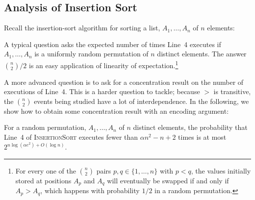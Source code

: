 \documentclass[lotsofwhite]{patmorin}
\begin{document}
\subsection{Analysis of Insertion Sort}

Recall the insertion-sort algorithm for sorting a list, $A_1,\ldots,A_n$
of $n$ elements:

\begin{algorithmic}[1]
     \ENDWHILE
  \ENDFOR
\end{algorithmic}

A typical question asks the expected number of times Line~4 executes
if $A_1,\ldots,A_n$ is a uniformly random permutation of $n$ distinct
elements.  The answer $\binom{n}{2}/2$ is an easy application of
linearity of expectation.\footnote{For every one of the $\binom{n}{2}$
pairs $p,q\in\{1,\ldots,n\}$ with $p<q$, the values initially stored at
positions $A_p$ and $A_q$ will eventually be swapped if and only if $A_p >
A_q$, which happens with probability $1/2$ in a random permutation.}

A more advanced question is to ask for a concentration result on the
number of executions of Line~4. This is a harder question to tackle;
because $>$ is transitive, the $\binom{n}{2}$ events being studied have
a lot of interdependence. In the following, we show how to obtain some
concentration result with an encoding argument:

\begin{thm}
For a random permutation, $A_1,\ldots,A_n$ of $n$ distinct elements,
the probability that Line~4 of \textsc{InsertionSort} executes fewer than
$\alpha n^2 - n + 2$ times is at most $2^{n\log(\alpha e^2)+O(\log n)}$.
\end{thm}
\end{document}
